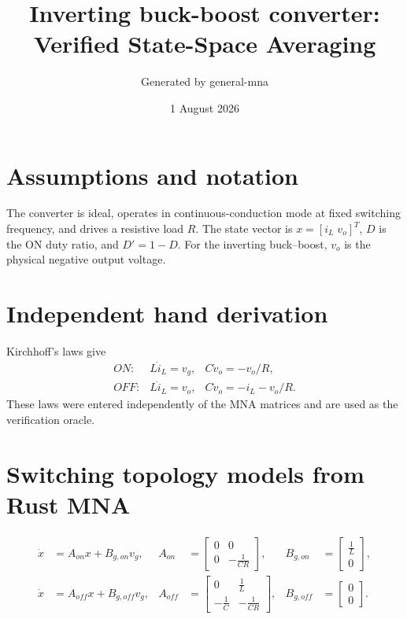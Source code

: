 \documentclass[11pt]{article}
\title{Inverting buck-boost converter: Verified State-Space Averaging}
\author{Generated by general-mna}
\date{1 August 2026}
\begin{document}
\maketitle

\section*{Assumptions and notation}
The converter is ideal, operates in continuous-conduction mode at fixed
switching frequency, and drives a resistive load $R$. The state vector is
$x=[i_L\;v_o]^T$, $D$ is the ON duty ratio, and $D'=1-D$. For the inverting
buck--boost, $v_o$ is the physical negative output voltage.

\section*{Independent hand derivation}
Kirchhoff's laws give
\begin{align}
ON: & L\dot i_L=v_g, & C\dot v_o=-v_o/R,\\
OFF: & L\dot i_L=v_o, & C\dot v_o=-i_L-v_o/R.
\end{align}
These laws were entered independently of the MNA matrices and are used as the
verification oracle.

\section*{Switching topology models from Rust MNA}
\begin{align}
\dot x &= A_{on}x+B_{g,on}v_g,
&A_{on}&=\left[\begin{matrix}0 & 0\\0 & - \frac{1}{C R}\end{matrix}\right],
&B_{g,on}&=\left[\begin{matrix}\frac{1}{L}\\0\end{matrix}\right],\\
\dot x &= A_{off}x+B_{g,off}v_g,
&A_{off}&=\left[\begin{matrix}0 & \frac{1}{L}\\- \frac{1}{C} & - \frac{1}{C R}\end{matrix}\right],
&B_{g,off}&=\left[\begin{matrix}0\\0\end{matrix}\right].
\end{align}
\end{document}

